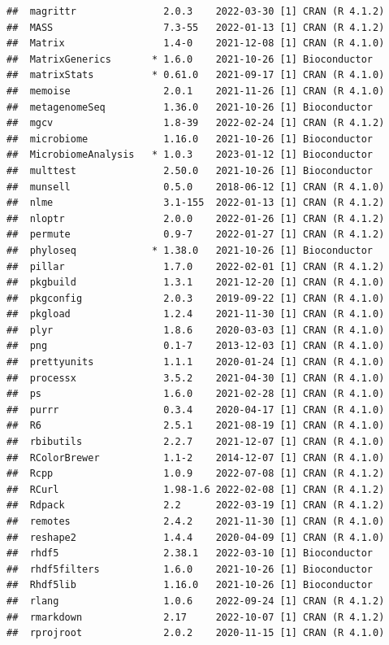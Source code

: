 \documentclass[
]{book}
\begin{document}
\begin{verbatim}
##  magrittr               2.0.3    2022-03-30 [1] CRAN (R 4.1.2)
##  MASS                   7.3-55   2022-01-13 [1] CRAN (R 4.1.2)
##  Matrix                 1.4-0    2021-12-08 [1] CRAN (R 4.1.0)
##  MatrixGenerics       * 1.6.0    2021-10-26 [1] Bioconductor
##  matrixStats          * 0.61.0   2021-09-17 [1] CRAN (R 4.1.0)
##  memoise                2.0.1    2021-11-26 [1] CRAN (R 4.1.0)
##  metagenomeSeq          1.36.0   2021-10-26 [1] Bioconductor
##  mgcv                   1.8-39   2022-02-24 [1] CRAN (R 4.1.2)
##  microbiome             1.16.0   2021-10-26 [1] Bioconductor
##  MicrobiomeAnalysis   * 1.0.3    2023-01-12 [1] Bioconductor
##  multtest               2.50.0   2021-10-26 [1] Bioconductor
##  munsell                0.5.0    2018-06-12 [1] CRAN (R 4.1.0)
##  nlme                   3.1-155  2022-01-13 [1] CRAN (R 4.1.2)
##  nloptr                 2.0.0    2022-01-26 [1] CRAN (R 4.1.2)
##  permute                0.9-7    2022-01-27 [1] CRAN (R 4.1.2)
##  phyloseq             * 1.38.0   2021-10-26 [1] Bioconductor
##  pillar                 1.7.0    2022-02-01 [1] CRAN (R 4.1.2)
##  pkgbuild               1.3.1    2021-12-20 [1] CRAN (R 4.1.0)
##  pkgconfig              2.0.3    2019-09-22 [1] CRAN (R 4.1.0)
##  pkgload                1.2.4    2021-11-30 [1] CRAN (R 4.1.0)
##  plyr                   1.8.6    2020-03-03 [1] CRAN (R 4.1.0)
##  png                    0.1-7    2013-12-03 [1] CRAN (R 4.1.0)
##  prettyunits            1.1.1    2020-01-24 [1] CRAN (R 4.1.0)
##  processx               3.5.2    2021-04-30 [1] CRAN (R 4.1.0)
##  ps                     1.6.0    2021-02-28 [1] CRAN (R 4.1.0)
##  purrr                  0.3.4    2020-04-17 [1] CRAN (R 4.1.0)
##  R6                     2.5.1    2021-08-19 [1] CRAN (R 4.1.0)
##  rbibutils              2.2.7    2021-12-07 [1] CRAN (R 4.1.0)
##  RColorBrewer           1.1-2    2014-12-07 [1] CRAN (R 4.1.0)
##  Rcpp                   1.0.9    2022-07-08 [1] CRAN (R 4.1.2)
##  RCurl                  1.98-1.6 2022-02-08 [1] CRAN (R 4.1.2)
##  Rdpack                 2.2      2022-03-19 [1] CRAN (R 4.1.2)
##  remotes                2.4.2    2021-11-30 [1] CRAN (R 4.1.0)
##  reshape2               1.4.4    2020-04-09 [1] CRAN (R 4.1.0)
##  rhdf5                  2.38.1   2022-03-10 [1] Bioconductor
##  rhdf5filters           1.6.0    2021-10-26 [1] Bioconductor
##  Rhdf5lib               1.16.0   2021-10-26 [1] Bioconductor
##  rlang                  1.0.6    2022-09-24 [1] CRAN (R 4.1.2)
##  rmarkdown              2.17     2022-10-07 [1] CRAN (R 4.1.2)
##  rprojroot              2.0.2    2020-11-15 [1] CRAN (R 4.1.0)

\end{verbatim}
\end{document}
